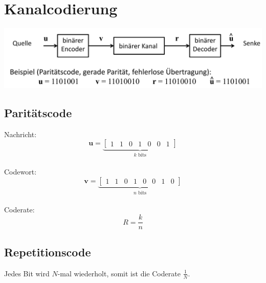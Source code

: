 \chapter{Kanalcodierung}
\begin{center}
	\includegraphics[width=.9\textwidth]{../fig/bincode.png}
\end{center}
\section{Paritätscode}
Nachricht:
\[ \textbf{u} = \underbrace{
	\begin{bmatrix}1 & 1 & 0 & 1 & 0 & 0 & 1\end{bmatrix}
	}_\textrm{$k$ bits} \]
~\\
Codewort:
\[ \textbf{v} = \underbrace{
	\begin{bmatrix}1 & 1 & 0 & 1 & 0 & 0 & 1 & 0\end{bmatrix}
	}_\textrm{$n$ bits} \]
~\\
Coderate:
\[ R = \frac{k}{n} \]
\section{Repetitionscode}
Jedes Bit wird $N$-mal wiederholt, somit ist die Coderate $\frac{1}{N}$.


